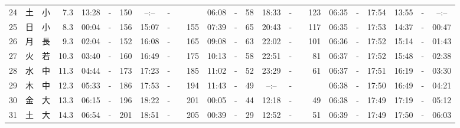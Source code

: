 \documentclass[12pt,a4j]{jsarticle}
\begin{document}
\begin{table}[htbp]
\begin{center}
{\begin{tabular}{|rc|cr|ccrccr|ccrccr|ccc|ccc|}
24 & 土 & 小 &  7.3 &  13:28 &-& 150 &  --:-- &-&~~~~~ &  06:08 &-&  58 &  18:33 &-& 123 & 06:35 & -& 17:54 & 13:55 & -& --:-- \\
25 & 日 & 小 &  8.3 &  00:04 &-& 156 &  15:07 &-& 155 &  07:39 &-&  65 &  20:43 &-& 117 & 06:35 & -& 17:53 & 14:37 & -& 00:47 \\
26 & 月 & 長 &  9.3 &  02:04 &-& 152 &  16:08 &-& 165 &  09:08 &-&  63 &  22:02 &-& 101 & 06:36 & -& 17:52 & 15:14 & -& 01:43 \\
27 & 火 & 若 & 10.3 &  03:40 &-& 160 &  16:49 &-& 175 &  10:13 &-&  58 &  22:51 &-&  81 & 06:37 & -& 17:52 & 15:48 & -& 02:38 \\
28 & 水 & 中 & 11.3 &  04:44 &-& 173 &  17:23 &-& 185 &  11:02 &-&  52 &  23:29 &-&  61 & 06:37 & -& 17:51 & 16:19 & -& 03:30 \\
29 & 木 & 中 & 12.3 &  05:33 &-& 186 &  17:53 &-& 194 &  11:43 &-&  49 &  --:-- &-&~~~~~ & 06:38 & -& 17:50 & 16:49 & -& 04:21 \\
30 & 金 & 大 & 13.3 &  06:15 &-& 196 &  18:22 &-& 201 &  00:05 &-&  44 &  12:18 &-&  49 & 06:38 & -& 17:49 & 17:19 & -& 05:12 \\
31 & 土 & 大 & 14.3 &  06:54 &-& 201 &  18:51 &-& 205 &  00:39 &-&  29 &  12:52 &-&  51 & 06:39 & -& 17:49 & 17:50 & -& 06:03 \\
   \hline
   \end{tabular}}
   \end{center}
\end{table}
\newpage
\end{document}
